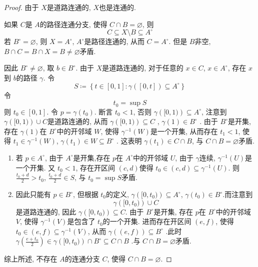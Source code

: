 \documentclass[../main.tex]{subfiles}
\begin{document}
\begin{proof}
  由于 \(  X  \)是道路连通的,  \(  X  \)也是连通的. 
  
  如果 \(  C  \)是 \(  A  \)的路径连通分支, 使得 \(  C\cap B= \varnothing  \), 则 \[
  C\subseteq X\setminus B\subseteq A^{\circ}
  \]
  若 \(  B^{\circ}= \varnothing  \), 则 \(  X= A^{\circ}  \), \(  A^{\circ}  \)是路径连通的, 从而 \(  C= A^{\circ}  \). 但是 \(  B  \)非空,  \(  B\cap C= B\cap X= B\neq \varnothing  \)矛盾.
  
  因此 \(  B^{\circ}\neq \varnothing  \), 取 \(  b \in B^{\circ}  \). 由于 \(  X  \)是道路连通的, 对于任意的 \(  x \in C  \), \(  x \in A^{\circ}  \), 存在 \(  x  \)到 \(  b  \)的路径 \(   \gamma   \).
  令 \[
  S\coloneqq \left\{ t\in \left[ 0,1 \right]:  \gamma \left( [0,t] \right)\subseteq A ^{\circ}  \right\}
  \]令 \[
  t_0= \sup S
  \]则 \(  t_0\in \left[ 0,1 \right]  \). 令 \(  p=  \gamma \left( t_0 \right)   \). 断言 \(  t_0<  1  \), 否则 \(   \gamma \left( [0,1) \right)\subseteq A^{\circ}   \), 注意到 \(   \gamma \left( [0,1) \right)\cup C   \)是道路连通的, 从而 \(   \gamma \left( [0,1) \right)\subseteq C   \)  , \(   \gamma \left( 1 \right)\in B^{\circ}   \) . 由于 \(  B^{\circ}  \)是开集, 存在 \(   \gamma \left( 1 \right)   \)在 \(  B^{\circ}  \)中的开邻域 \(  W  \), 使得 \(   \gamma ^{-1} \left( W \right)   \)是一个开集, 从而存在 \(  t_1< 1  \), 使得 \(  t_1 \in  \gamma ^{-1} \left( W \right)   \),  \(   \gamma \left( t_1 \right)\in W\subseteq B^{\circ}   \)    . 这表明 \(   \gamma \left( t_1 \right)\in C\cap B   \), 与 \(  C\cap B= \varnothing  \)矛盾.     
  \begin{enumerate}
    \item 若 \(  p \in A^{\circ}  \), 由于 \(  A^{\circ}  \)是开集,存在 \(  p  \)在 \(  A^{\circ}  \)中的开邻域 \(  U  \), 由于 \(   \gamma   \)连续, \(   \gamma ^{-1} \left( U \right)   \)是一个开集. 又 \(  t_0< 1  \), 存在开区间 \(  \left( c,d \right)   \)使得 \( t_0\in \left( c,d\right)\subseteq  \gamma ^{-1} \left( U \right)   \). 则          \(  \frac{t_0+ d }{ 2}> t_0   \), \(  \frac{t_0+ d }{2 }\in S   \), 与 \(  t_0= \sup S  \)矛盾.
    \item 因此只能有 \(  p\in B^{\circ}  \), 但根据 \(  t_0  \)的定义,   \(   \gamma \left( [0,t_0) \right)\subseteq A^{\circ}   \),  \(   \gamma \left( t_0 \right)\in B^{\circ}   \).而注意到 \[
     \gamma \left( [0,t_0) \right)\cup C 
    \]是道路连通的, 因此 \(   \gamma \left( [0,t_0) \right)\subseteq C   \). 由于 \(  B^{\circ}  \)是开集, 存在 \(  p  \)在 \(  B^{\circ}  \)中的开邻域 \(  V  \), 使得 \(   \gamma ^{-1} \left( V \right)   \)是包含了 \(  t_0  \)的一个开集. 进而存在开区间 \(  \left( e,f \right)   \), 使得 \(  t_0\in \left( e,f \right)\subseteq  \gamma ^{-1} \left( V \right)    \), 从而 \(   \gamma \left( \left( e,f \right)  \right)\subseteq B^{\circ}   \)         .此时 \(  \gamma  \left( \frac{e+ t_0 }{2 }   \right) \in  \gamma \left( [0,t_0) \right)\cap B^{\circ}\subseteq C\cap B   \) .与 \(  C\cap B= \varnothing  \)矛盾. 
  \end{enumerate}
综上所述,  不存在 \(  A  \)的连通分支 \(  C  \), 使得 \(  C\cap B= \varnothing  \).   
\end{proof}
\end{document}
